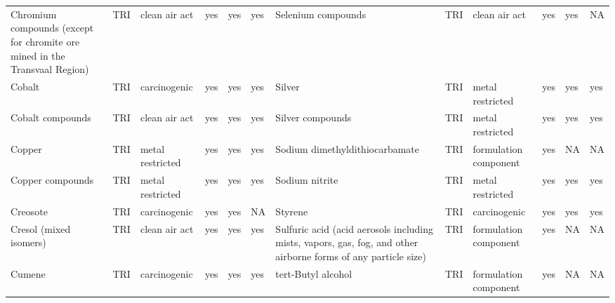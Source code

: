 \begin{table}[H]
{\begin{tabular}{llllllllllll}
            Chromium compounds (except for chromite ore mined in the Transvaal Region) & TRI            & clean air act & yes & yes & yes & Selenium compounds & TRI & clean air act & yes & yes & NA\\
            Cobalt                                                                     & TRI            & carcinogenic          & yes    & yes     & yes  & Silver                                                                                                             & TRI            & metal restricted      & yes    & yes     & yes  \\
            Cobalt compounds                                                           & TRI            & clean air act         & yes    & yes     & yes  & Silver compounds                                                                                                   & TRI            & metal restricted & yes & yes & yes\\
            Copper                                                                     & TRI            & metal restricted      & yes    & yes     & yes  & Sodium dimethyldithiocarbamate                                                                                     & TRI            & formulation component & yes & NA & NA\\
            Copper compounds                                                           & TRI            & metal restricted      & yes    & yes     & yes  & Sodium nitrite                                                                                                     & TRI            & metal restricted & yes & yes & yes\\
            Creosote                                                                   & TRI            & carcinogenic          & yes    & yes     & NA   & Styrene                                                                                                            & TRI            & carcinogenic          & yes    & yes     & yes  \\
            Cresol (mixed isomers)                                                     & TRI            & clean air act         & yes    & yes     & yes  & Sulfuric acid (acid aerosols including mists, vapors, gas, fog, and other airborne forms of any particle size) & TRI & formulation component & yes & NA & NA\\
            Cumene                                                                     & TRI            & carcinogenic          & yes    & yes     & yes  & tert-Butyl alcohol                                                                                                 & TRI            & formulation component & yes & NA & NA\\

\end{tabular}}
\end{table}

